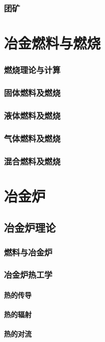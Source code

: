 \documentclass[UTF8]{../../ApplicationUniverse}
\begin{document}
        \subsubsection{团矿}
\section{冶金燃料与燃烧}
    \subsubsection{燃烧理论与计算}
    \subsubsection{固体燃料及燃烧}
    \subsubsection{液体燃料及燃烧}
    \subsubsection{气体燃料及燃烧}
    \subsubsection{混合燃料及燃烧}
\section{冶金炉}
    \subsection{冶金炉理论}
        \subsubsection{燃料与冶金炉}
        \subsubsection{冶金炉热工学}
            \paragraph{热的传导}
            \paragraph{热的辐射}
            \paragraph{热的对流}
\end{document}
